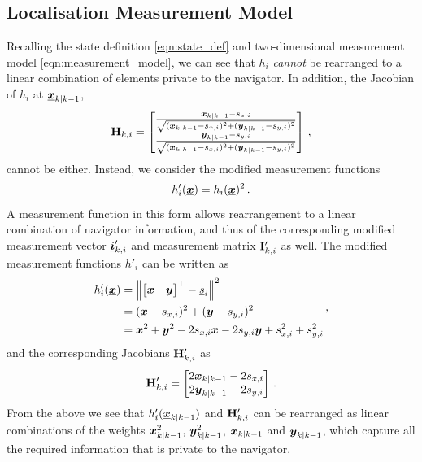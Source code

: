 \documentclass[10pt,journal,compsoc]{IEEEtran}
\theoremstyle{definition}
\theoremstyle{definition}
\theoremstyle{remark}
\begin{document}
\subsection{Localisation Measurement Model} \label{subsec:observation_model}
Recalling the state definition \eqref{eqn:state_def} and two-dimensional measurement model \eqref{eqn:measurement_model}, we can see that $h_i$ \textit{cannot} be rearranged to a linear combination of elements private to the navigator. In addition, the Jacobian of $h_i$ at ${\boldsymbol{\underline{x}}}_{k|k-1}$,
\begin{equation}
    {\ensuremath{{\mathbf{H}}}}_{k,i} = 
    \begin{bmatrix}
        \frac{{\boldsymbol{x}}_{k|k-1} - s_{x,i}}{\sqrt{({\boldsymbol{x}}_{k|k-1} - s_{x,i})^2 + ({\boldsymbol{y}}_{k|k-1} - s_{y,i})^2}} \\
        \frac{{\boldsymbol{y}}_{k|k-1} - s_{y,i}}{\sqrt{({\boldsymbol{x}}_{k|k-1} - s_{x,i})^2 + ({\boldsymbol{y}}_{k|k-1} - s_{y,i})^2}} 
    \end{bmatrix}\,,
\end{equation}
cannot be either. Instead, we consider the modified measurement functions
\begin{equation}
    h'_i(\rvec{x}) = h_i(\rvec{x})^2\,. \label{eqn:modified_measurement_func}
\end{equation}
A measurement function in this form allows rearrangement to a linear combination of navigator information, and thus of the corresponding modified measurement vector ${\boldsymbol{\underline{i}}}'_{k,i}$ and measurement matrix ${{\mathbf{I}}}'_{k,i}$ as well. The modified measurement functions $h'_i$ can be written as
\begin{equation}
    \begin{split}
        h'_i({\boldsymbol{\underline{x}}}) &= \left\lVert
        \begin{bmatrix}
            {\boldsymbol{x}} & {\boldsymbol{y}}
        \end{bmatrix}^\top - {\underline{s}}_i\right\rVert^2 \\
        &= ({\boldsymbol{x}} - s_{x,i})^2 + ({\boldsymbol{y}} - s_{y,i})^2 \\
        &= {\boldsymbol{x}}^2 + {\boldsymbol{y}}^2 -2s_{x,i}{\boldsymbol{x}} -2s_{y,i}{\boldsymbol{y}} +s_{x,i}^2 +s_{y,i}^2
    \end{split}\,,
\end{equation}
and the corresponding Jacobians ${{\mathbf{H}}}'_{k,i}$ as
\begin{equation}
    \mat{H}'_{k,i} = 
    \begin{bmatrix}
        2\rv{x}_{k|k-1} - 2s_{x,i} \\
        2\rv{y}_{k|k-1} - 2s_{y,i}
    \end{bmatrix}\,. \label{eqn:modified_jacobian}
\end{equation}
From the above we see that $h'_i({\boldsymbol{\underline{x}}}_{k|k-1})$ and ${{\mathbf{H}}}'_{k,i}$ can be rearranged as linear combinations of the weights ${\boldsymbol{x}}_{k|k-1}^2$, ${\boldsymbol{y}}_{k|k-1}^2$, ${\boldsymbol{x}}_{k|k-1}$ and ${\boldsymbol{y}}_{k|k-1}$, which capture all the required information that is private to the navigator. 
\end{document}

